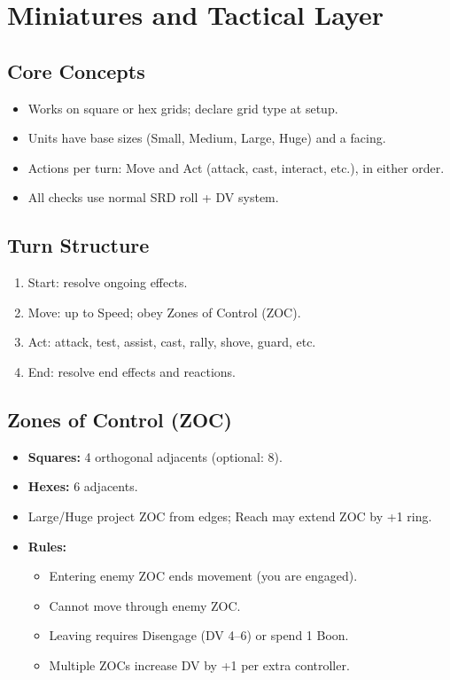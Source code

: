 \section{Miniatures and Tactical Layer}
\label{sec:miniatures}

\subsection{Core Concepts}
\begin{itemize}
  \item Works on square or hex grids; declare grid type at setup.
  \item Units have base sizes (Small, Medium, Large, Huge) and a facing.
  \item Actions per turn: Move and Act (attack, cast, interact, etc.), in either order.
  \item All checks use normal SRD roll + DV system.
\end{itemize}

\subsection{Turn Structure}
\begin{enumerate}
  \item Start: resolve ongoing effects.
  \item Move: up to Speed; obey Zones of Control (ZOC).
  \item Act: attack, test, assist, cast, rally, shove, guard, etc.
  \item End: resolve end effects and reactions.
\end{enumerate}

\subsection{Zones of Control (ZOC)}
\begin{itemize}
  \item \textbf{Squares:} 4 orthogonal adjacents (optional: 8). 
  \item \textbf{Hexes:} 6 adjacents.
  \item Large/Huge project ZOC from edges; Reach may extend ZOC by +1 ring.
  \item \textbf{Rules:} 
    \begin{itemize}
      \item Entering enemy ZOC ends movement (you are engaged).
      \item Cannot move through enemy ZOC.
      \item Leaving requires Disengage (DV 4–6) or spend 1 Boon.
      \item Multiple ZOCs increase DV by +1 per extra controller.
    \end{itemize}
\end{itemize}

